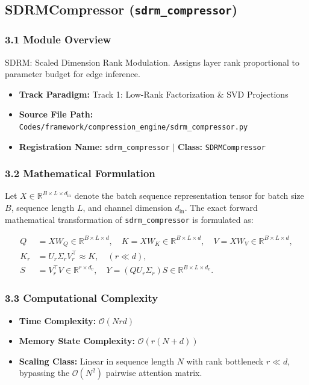 \subsection{SDRMCompressor (\texttt{sdrm\_compressor})}
\label{sec:app_module_sdrm_compressor}

\subsubsection*{3.1 Module Overview}
SDRM: Scaled Dimension Rank Modulation. Assigns layer rank proportional to parameter budget for edge inference.
\begin{itemize}
    \item \textbf{Track Paradigm:} Track 1: Low-Rank Factorization & SVD Projections
    \item \textbf{Source File Path:} \texttt{Codes/framework/compression\_engine/sdrm\_compressor.py}
    \item \textbf{Registration Name:} \texttt{sdrm\_compressor} $\mid$ \textbf{Class:} \texttt{SDRMCompressor}
\end{itemize}

\subsubsection*{3.2 Mathematical Formulation}
Let $X \in \mathbb{R}^{B \times L \times d_{\text{in}}}$ denote the batch sequence representation tensor for batch size $B$, sequence length $L$, and channel dimension $d_{\text{in}}$. The exact forward mathematical transformation of \texttt{sdrm\_compressor} is formulated as:

\begin{align}
Q &= X W_Q \in \mathbb{R}^{B \times L \times d}, \quad K = X W_K \in \mathbb{R}^{B \times L \times d}, \quad V = X W_V \in \mathbb{R}^{B \times L \times d}, \\
K_r &= U_r \Sigma_r V_r^\top \approx K, \quad (r \ll d), \\
S &= V_r^\top V \in \mathbb{R}^{r \times d_v}, \quad Y = (Q U_r \Sigma_r) S \in \mathbb{R}^{B \times L \times d_v}.
\end{align}


\subsubsection*{3.3 Computational Complexity}
\begin{itemize}
    \item \textbf{Time Complexity:} $\mathcal{O}(N r d)$
    \item \textbf{Memory State Complexity:} $\mathcal{O}(r(N + d))$
    \item \textbf{Scaling Class:} Linear in sequence length $N$ with rank bottleneck $r \ll d$, bypassing the $\mathcal{O}(N^2)$ pairwise attention matrix.
\end{itemize}

